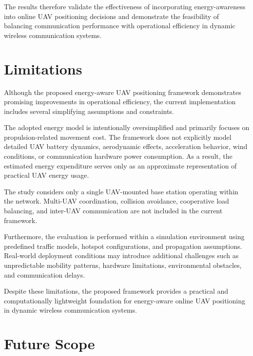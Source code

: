 \documentclass[12pt]{report}
\begin{document}
The results therefore validate the effectiveness of incorporating energy-awareness into online UAV positioning decisions and demonstrate the feasibility of balancing communication performance with operational efficiency in dynamic wireless communication systems.%

\chapter{Limitations}

Although the proposed energy-aware UAV positioning framework demonstrates promising improvements in operational efficiency, the current implementation includes several simplifying assumptions and constraints.

The adopted energy model is intentionally oversimplified and primarily focuses on propulsion-related movement cost. The framework does not explicitly model detailed UAV battery dynamics, aerodynamic effects, acceleration behavior, wind conditions, or communication hardware power consumption. As a result, the estimated energy expenditure serves only as an approximate representation of practical UAV energy usage.

The study considers only a single UAV-mounted base station operating within the network. Multi-UAV coordination, collision avoidance, cooperative load balancing, and inter-UAV communication are not included in the current framework.

Furthermore, the evaluation is performed within a simulation environment using predefined traffic models, hotspot configurations, and propagation assumptions. Real-world deployment conditions may introduce additional challenges such as unpredictable mobility patterns, hardware limitations, environmental obstacles, and communication delays.

Despite these limitations, the proposed framework provides a practical and computationally lightweight foundation for energy-aware online UAV positioning in dynamic wireless communication systems.


\chapter{Future Scope}
\end{document}
